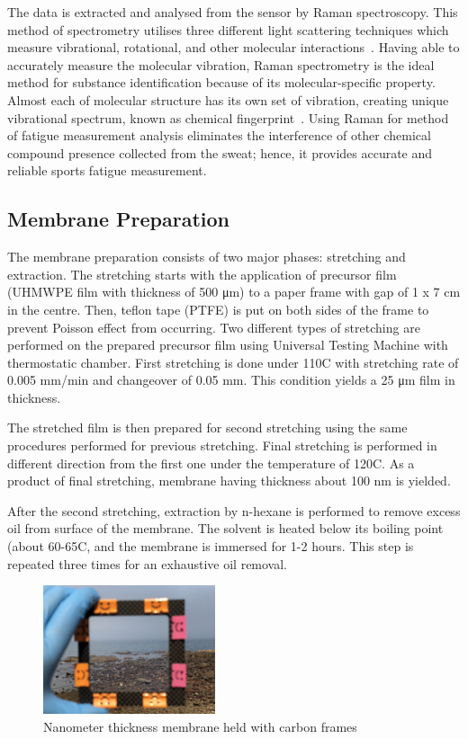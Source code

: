 \documentclass[journal]{IEEEtran}
\begin{document}
The data is extracted and analysed from the sensor by Raman spectroscopy. This method of spectrometry utilises three different light scattering techniques which measure vibrational, rotational, and other molecular interactions~\cite{PracticalRaman}. Having able to accurately measure the molecular vibration, Raman spectrometry is the ideal method for substance identification because of its molecular-specific property. Almost each of molecular structure has its own set of vibration, creating unique vibrational spectrum, known as chemical fingerprint~\cite{ModernSpectro, RamanEffect}. Using Raman for method of fatigue measurement analysis eliminates the interference of other chemical compound presence collected from the sweat; hence, it provides accurate and reliable sports fatigue measurement.

\subsection{Membrane Preparation}

The membrane preparation consists of two major phases: stretching and extraction. The stretching starts with the application of precursor film (UHMWPE film with thickness of 500 μm) to a paper frame with gap of 1 x 7 cm in the centre. Then, teflon tape (PTFE) is put on both sides of the frame to prevent Poisson effect from occurring. Two different types of stretching are performed on the prepared precursor film using Universal Testing Machine with thermostatic chamber. First stretching is done under 110\degree C with stretching rate of 0.005 mm/min and changeover of 0.05 mm. This condition yields a 25 μm film in thickness.

The stretched film is then prepared for second stretching using the same procedures performed for previous stretching. Final stretching is performed in different direction from the first one under the temperature of 120\degree C. As a product of final stretching, membrane having thickness about 100 nm is yielded.

After the second stretching, extraction by n-hexane is performed to remove excess oil from surface of the membrane. The solvent is heated below its boiling point (about 60-65\degree C, and the membrane is immersed for 1-2 hours. This step is repeated three times for an exhaustive oil removal. 

\begin{figure}[H]
\centering
\includegraphics[width=0.45\textwidth]{images/membrane.jpg}
\caption{Nanometer thickness membrane held with carbon frames}\label{fig:membrane}
\end{figure}
\end{document}
